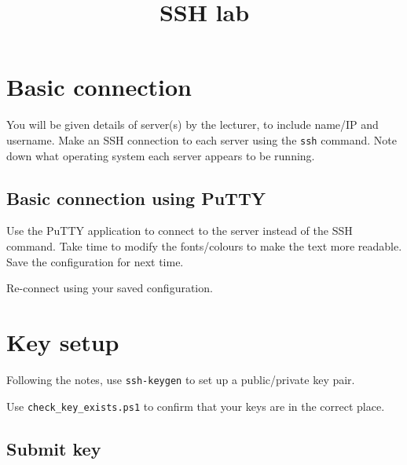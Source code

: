 \documentclass{pgnotes}
\title{SSH lab}
\begin{document}
\maketitle

\section{Basic connection}

You will be given details of server(s) by the lecturer, to include name/IP and username.
Make an SSH connection to each server using the \texttt{ssh} command.
Note down what operating system each server appears to be running. 

\subsection{Basic connection using PuTTY}

Use the PuTTY application to connect to the server instead of the SSH command.
Take time to modify the fonts/colours to make the text more readable.
Save the configuration for next time.

Re-connect using your saved configuration.

\section{Key setup}

Following the notes, use \texttt{ssh-keygen} to set up a public/private key pair.

Use \texttt{check\_key\_exists.ps1} to confirm that your keys are in the correct place.

\subsection{Submit key}
\end{document}
